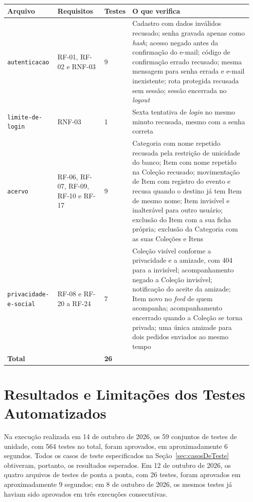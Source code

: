 \FloatBarrier
\begin{quadro}[h!]
\caption{Testes de ponta a ponta da API}
\label{quad:testesPontaAPonta}
\footnotesize
\begin{tabular}{|p{4.1cm}|p{2.4cm}|p{1.2cm}|p{6.1cm}|}
\hline
\textbf{Arquivo} & \textbf{Requisitos} & \textbf{Testes} & \textbf{O que verifica} \\ \hline
\texttt{autenticacao} & RF-01, RF-02 e RNF-03 & 9 & Cadastro com dados inválidos recusado; senha gravada apenas como \textit{hash}; acesso negado antes da confirmação do e-mail; código de confirmação errado recusado; mesma mensagem para senha errada e e-mail inexistente; rota protegida recusada sem sessão; sessão encerrada no \textit{logout} \\ \hline
\texttt{limite-de-login} & RNF-03 & 1 & Sexta tentativa de \textit{login} no mesmo minuto recusada, mesmo com a senha correta \\ \hline
\texttt{acervo} & RF-06, RF-07, RF-09, RF-10 e RF-17 & 9 & Categoria com nome repetido recusada pela restrição de unicidade do banco; Item com nome repetido na Coleção recusado; movimentação de Item com registro do evento e recusa quando o destino já tem Item de mesmo nome; Item invisível e inalterável para outro usuário; exclusão do Item com a sua ficha própria; exclusão da Categoria com as suas Coleções e Itens \\ \hline
\texttt{privacidade-e-social} & RF-08 e RF-20 a RF-24 & 7 & Coleção visível conforme a privacidade e a amizade, com 404 para a invisível; acompanhamento negado a Coleção invisível; notificação do aceite da amizade; Item novo no \textit{feed} de quem acompanha; acompanhamento encerrado quando a Coleção se torna privada; uma única amizade para dois pedidos enviados ao mesmo tempo \\ \hline
\textbf{Total} &  & \textbf{26} &  \\ \hline
\end{tabular}
\end{quadro}
\FloatBarrier

\section{Resultados e Limitações dos Testes Automatizados}

Na execução realizada em 14 de outubro de 2026, os 59 conjuntos de testes de unidade, com 564 testes no total, foram aprovados, em aproximadamente 6 segundos. Todos os casos de teste especificados na Seção~\ref{sec:casosDeTeste} obtiveram, portanto, os resultados esperados. Em 12 de outubro de 2026, os quatro arquivos de testes de ponta a ponta, com 26 testes, foram aprovados em aproximadamente 9 segundos; em 8 de outubro de 2026, os mesmos testes já haviam sido aprovados em três execuções consecutivas.

